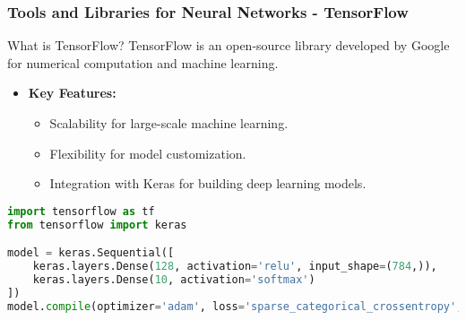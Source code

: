 \documentclass[aspectratio=169]{beamer}
\begin{document}
\begin{frame}[fragile]
    \frametitle{Tools and Libraries for Neural Networks - TensorFlow}
    \begin{block}{What is TensorFlow?}
        TensorFlow is an open-source library developed by Google for numerical computation and machine learning.
    \end{block}
    
    \begin{itemize}
        \item \textbf{Key Features:}
        \begin{itemize}
            \item Scalability for large-scale machine learning.
            \item Flexibility for model customization.
            \item Integration with Keras for building deep learning models.
        \end{itemize}
    \end{itemize}
    
    \begin{lstlisting}[language=Python]
import tensorflow as tf
from tensorflow import keras

model = keras.Sequential([
    keras.layers.Dense(128, activation='relu', input_shape=(784,)),
    keras.layers.Dense(10, activation='softmax')
])
model.compile(optimizer='adam', loss='sparse_categorical_crossentropy', metrics=['accuracy'])
    \end{lstlisting}
\end{frame}
\end{document}
